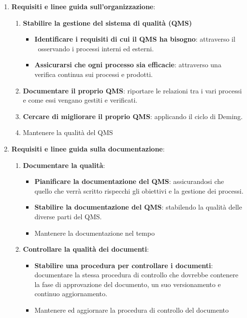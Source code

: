 	\begin{enumerate}
		\item \textbf{Requisiti e linee guida sull'organizzazione}:
		\begin{enumerate}
			\item \textbf{Stabilire la gestione del sistema di qualità (QMS)}
			\begin{itemize}
				\item \textbf{Identificare i requisiti di cui il QMS ha bisogno}: attraverso il \PdQ~osservando i processi interni ed esterni.
				\item \textbf{Assicurarsi che ogni processo sia efficacie}: attraverso una verifica continua sui processi e prodotti.
			\end{itemize}
			\item \textbf{Documentare il proprio QMS}: riportare le relazioni tra i vari processi e come essi vengano gestiti e verificati.
			\item \textbf{Cercare di migliorare il proprio QMS}: applicando il ciclo di Deming.
			\item Mantenere la qualità del QMS
		\end{enumerate} 
		
		\item \textbf{Requisiti e linee guida sulla documentazione}:
		\begin{enumerate}
			\item \textbf{Documentare la qualità}:
			\begin{itemize}
				\item \textbf{Pianificare la documentazione del QMS}: assicurandosi che quello che verrà scritto rispecchi gli obiettivi e la gestione dei processi.
				\item \textbf{Stabilire la documentazione del QMS}: stabilendo la qualità delle diverse parti del QMS.
				\item Mantenere la documentazione nel tempo
			\end{itemize}
			
			\item \textbf{Controllare la qualità dei documenti}:
			\begin{itemize}
				\item \textbf{Stabilire una procedura per controllare i documenti}: documentare la stessa procedura di controllo che dovrebbe contenere la fase di approvazione del documento, un suo versionamento e continuo aggiornamento.
				\item Mantenere ed aggiornare la procedura di controllo del documento
			\end{itemize}
		\end{enumerate}
	\end{enumerate}
